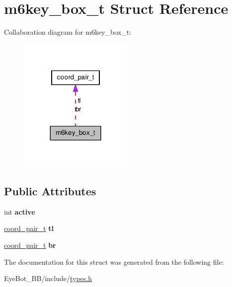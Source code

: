 \hypertarget{structm6key__box__t}{\section{m6key\-\_\-box\-\_\-t \-Struct \-Reference}
\label{structm6key__box__t}
}


\-Collaboration diagram for m6key\-\_\-box\-\_\-t\-:\nopagebreak
\begin{figure}[H]
\begin{center}
\leavevmode
\includegraphics[width=156pt]{structm6key__box__t__coll__graph}
\end{center}
\end{figure}
\subsection*{\-Public \-Attributes}
\begin{DoxyCompactItemize}
\item 
\hypertarget{structm6key__box__t_acf427e36e60d16341a9da385b228f1eb}{int {\bfseries active}}\label{structm6key__box__t_acf427e36e60d16341a9da385b228f1eb}

\item 
\hypertarget{structm6key__box__t_a3ae3787dc4ac4f552befd0ed7be7e7ee}{\hyperlink{structcoord__pair__t}{coord\-\_\-pair\-\_\-t} {\bfseries tl}}\label{structm6key__box__t_a3ae3787dc4ac4f552befd0ed7be7e7ee}

\item 
\hypertarget{structm6key__box__t_ae3d9bd70f4117eacb63d9d77a689a018}{\hyperlink{structcoord__pair__t}{coord\-\_\-pair\-\_\-t} {\bfseries br}}\label{structm6key__box__t_ae3d9bd70f4117eacb63d9d77a689a018}

\end{DoxyCompactItemize}


\-The documentation for this struct was generated from the following file\-:\begin{DoxyCompactItemize}
\item 
\-Eye\-Bot\-\_\-\-B\-B/include/\hyperlink{types_8h}{types.\-h}\end{DoxyCompactItemize}
